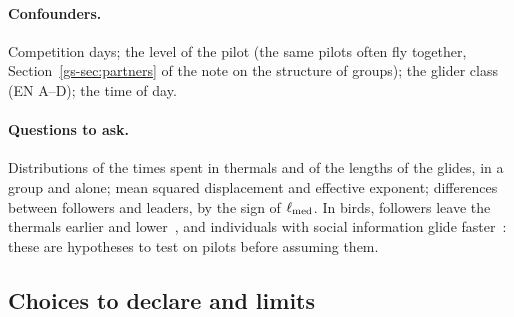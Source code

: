 \paragraph{Confounders.} Competition days; the level of the pilot (the same pilots often fly
together, Section~\ref{gs-sec:partners} of the note on the structure of groups); the glider class
(EN A--D); the time of day.

\paragraph{Questions to ask.} Distributions of the times spent in thermals and of the lengths of
the glides, in a group and alone; mean squared displacement and effective exponent; differences
between followers and leaders, by the sign of $\ell_{\rm med}$. In birds, followers leave the
thermals earlier and lower~\cite{flack2018}, and individuals with social information glide
faster~\cite{williams2018}: these are hypotheses to test on pilots before assuming them.

\subsection{Choices to declare and limits}\label{sec:parameters}

